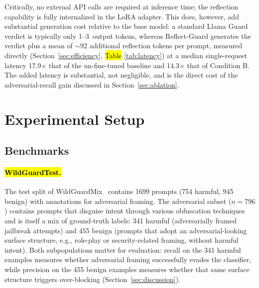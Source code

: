 \documentclass[superintelligence,article,accept,moreauthors]{Definitions/mdpi}
\begin{document}
Critically, no external API calls are required at inference time; the reflection capability is fully internalized in the LoRA adapter. This does, however, add substantial generation cost relative to the base model: a standard Llama Guard verdict is typically only 1--3~output tokens, whereas Reflect-Guard generates the verdict plus a mean of $\sim$92 additional reflection tokens per prompt, measured directly (Section~\ref{sec:efficiency}, \hl{Table} %
 \ref{tab:latency}) at a median single-request latency 17.9$\times$ that of the un-fine-tuned baseline and 14.3$\times$ that of Condition B. The added latency is substantial, not negligible, and is the direct cost of the adversarial-recall gain discussed in Section~\ref{sec:ablation}.

\section{Experimental Setup}

\subsection{Benchmarks}
\label{sec:benchmarks}

\paragraph{\hl{WildGuardTest.} %
} The test split of WildGuardMix~\citep{han2024wildguard} contains 1699 prompts (754 harmful, 945 benign) with annotations for adversarial framing. The adversarial subset ($n = 796$) contains prompts that disguise intent through various obfuscation techniques and is itself a mix of ground-truth labels: 341 harmful (adversarially framed jailbreak attempts) and 455 benign (prompts that adopt an adversarial-looking surface structure, e.g., role-play or security-related framing, without harmful intent). Both subpopulations matter for evaluation: recall on the 341 harmful examples measures whether adversarial framing successfully evades the classifier, while precision on the 455 benign examples measures whether that same surface structure triggers over-blocking (Section~\ref{sec:discussion}).
\end{document}
